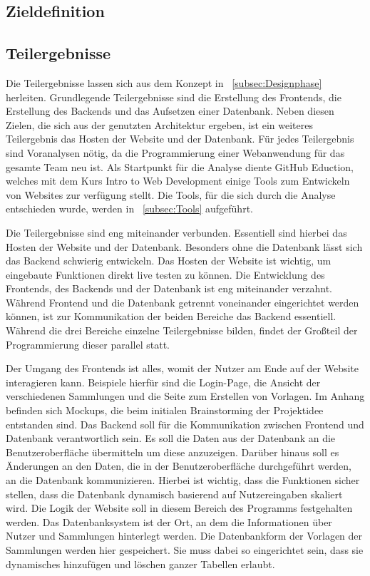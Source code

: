 \subsection{Zieldefinition}\label{subsec:Zieldefinition}

\subsection{Teilergebnisse}\label{subsec:Teilergebnisses}
Die Teilergebnisse lassen sich aus dem Konzept in ~\ref{subsec:Designphase} herleiten.
Grundlegende Teilergebnisse sind die Erstellung des Frontends, die Erstellung des Backends und das Aufsetzen einer Datenbank.
Neben diesen Zielen, die sich aus der genutzten Architektur ergeben, ist ein weiteres Teilergebnis das Hosten der Website und der Datenbank.
Für jedes Teilergebnis sind Voranalysen nötig, da die Programmierung einer Webanwendung für das gesamte Team neu ist.
Als Startpunkt für die Analyse diente GitHub Eduction, welches mit dem Kurs Intro to Web Development einige Tools zum Entwickeln von Websites zur verfügung stellt.
Die Tools, für die sich durch die Analyse entschieden wurde, werden in ~\ref{subsec:Tools} aufgeführt.

Die Teilergebnisse sind eng miteinander verbunden.
Essentiell sind hierbei das Hosten der Website und der Datenbank.
Besonders ohne die Datenbank lässt sich das Backend schwierig entwickeln.
Das Hosten der Website ist wichtig, um eingebaute Funktionen direkt live testen zu können.
Die Entwicklung des Frontends, des Backends und der Datenbank ist eng miteinander verzahnt.
Während Frontend und die Datenbank getrennt voneinander eingerichtet werden können, ist zur Kommunikation der beiden Bereiche das Backend essentiell.
Während die drei Bereiche einzelne Teilergebnisse bilden, findet der Großteil der Programmierung dieser parallel statt.

Der Umgang des Frontends ist alles, womit der Nutzer am Ende auf der Website interagieren kann.
Beispiele hierfür sind die Login-Page, die Ansicht der verschiedenen Sammlungen und die Seite zum Erstellen von Vorlagen.
Im Anhang befinden sich Mockups, die beim initialen Brainstorming der Projektidee entstanden sind.
Das Backend soll für die Kommunikation zwischen Frontend und Datenbank verantwortlich sein.
Es soll die Daten aus der Datenbank an die Benutzeroberfläche übermitteln um diese anzuzeigen.
Darüber hinaus soll es Änderungen an den Daten, die in der Benutzeroberfläche durchgeführt werden, an die Datenbank kommunizieren.
Hierbei ist wichtig, dass die Funktionen sicher stellen, dass die Datenbank dynamisch basierend auf Nutzereingaben skaliert wird.
Die Logik der Website soll in diesem Bereich des Programms festgehalten werden.
Das Datenbanksystem ist der Ort, an dem die Informationen über Nutzer und Sammlungen hinterlegt werden.
Die Datenbankform der Vorlagen der Sammlungen werden hier gespeichert.
Sie muss dabei so eingerichtet sein, dass sie dynamisches hinzufügen und löschen ganzer Tabellen erlaubt.

